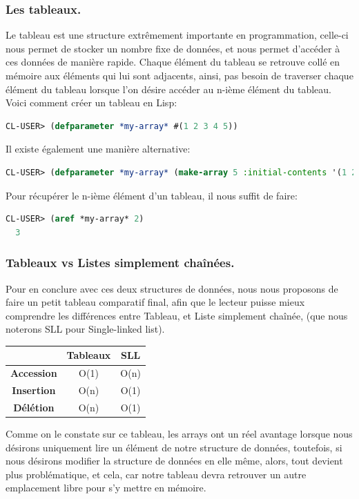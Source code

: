 \documentclass[a4paper, 12pt]{article}
\numberwithin{equation}{subsection}
\begin{document}
\subsubsection{Les tableaux.}
Le tableau est une structure extrêmement importante en programmation,
celle-ci nous permet de stocker un nombre fixe de données, et nous permet d'accéder à ces données de manière rapide. Chaque élément du tableau se retrouve collé en mémoire aux éléments qui lui sont adjacents, ainsi, pas besoin de traverser chaque élément du tableau lorsque l'on désire accéder au n-ième élément du tableau. \\[0.2cm]
Voici comment créer un tableau en Lisp:
\begin{lstlisting}[language=Lisp]
  CL-USER> (defparameter *my-array* #(1 2 3 4 5))
\end{lstlisting}
Il existe également une manière alternative:
\begin{lstlisting}[language=Lisp]
  CL-USER> (defparameter *my-array* (make-array 5 :initial-contents '(1 2 3 4 5)))
\end{lstlisting}
Pour récupérer le n-ième élément d'un tableau, il nous suffit de faire:
\begin{lstlisting}[language=Lisp]
  CL-USER> (aref *my-array* 2)
  3
\end{lstlisting}
\subsubsection{Tableaux vs Listes simplement chaînées.}
Pour en conclure avec ces deux structures de données, nous nous proposons de faire un petit tableau comparatif final, afin que le lecteur puisse mieux comprendre les différences entre Tableau, et Liste simplement chaînée, (que nous noterons SLL pour Single-linked list).
\begin{table}[H]
  \centering
  \begin{tabular}{|c|c|c|}
    \hline & Tableaux & SLL \\
    \hline {\bf Accession} & O(1) & O(n) \\
    \hline {\bf Insertion} & O(n) & O(1) \\
    \hline {\bf Délétion}  & O(n) & O(1) \\
    \hline
  \end{tabular}
\end{table} \smallskip
Comme on le constate sur ce tableau, les arrays ont un réel avantage lorsque nous désirons uniquement lire un élément de notre structure de données, toutefois, si nous désirons modifier la structure de données en elle même, alors, tout devient plus problématique, et cela, car notre tableau devra retrouver un autre emplacement libre pour s'y mettre en mémoire. \\
\end{document}
